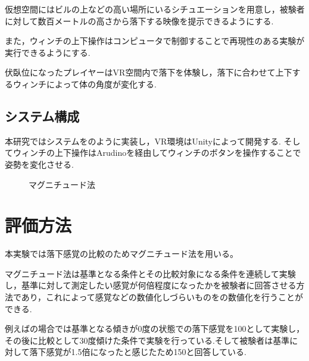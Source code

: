 \documentclass[uplatex]{jsarticle}
\begin{document}
仮想空間にはビルの上などの高い場所にいるシチュエーションを用意し，被験者に対して数百メートルの高さから落下する映像を提示できるようにする.

また，ウィンチの上下操作はコンピュータで制御することで再現性のある実験が実行できるようにする.

伏臥位になったプレイヤーはVR空間内で落下を体験し，落下に合わせて上下するウィンチによって体の角度が変化する.

\subsection{システム構成}
本研究ではシステムをのように実装し，VR環境はUnityによって開発する.
そしてウィンチの上下操作はArudinoを経由してウィンチのボタンを操作することで姿勢を変化させる.


 \begin{figure}[tb]
  \centering
  \caption{マグニチュード法}
  \label{fig:magnitude}

\end{figure}

\section{評価方法}
本実験では落下感覚の比較のためマグニチュード法を用いる。

マグニチュード法は基準となる条件とその比較対象になる条件を連続して実験し，基準に対して測定したい感覚が何倍程度になったかを被験者に回答させる方法であり，これによって感覚などの数値化しづらいものをの数値化を行うことができる.

例えばの場合では基準となる傾きが0度の状態での落下感覚を100として実験し，その後に比較として30度傾けた条件で実験を行っている.そして被験者は基準に対して落下感覚が1.5倍になったと感じたため150と回答している.
\end{document}
